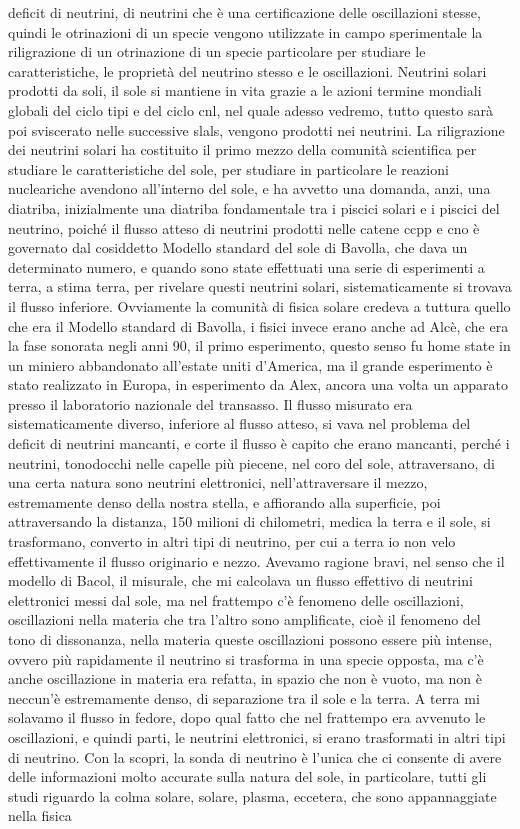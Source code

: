 deficit di neutrini, di neutrini che è una certificazione delle oscillazioni stesse, quindi le otrinazioni di un specie vengono utilizzate in campo sperimentale la riligrazione di un otrinazione di un specie particolare per studiare le caratteristiche, le proprietà del neutrino stesso e le oscillazioni. Neutrini solari prodotti da soli, il sole si mantiene in vita grazie a le azioni termine mondiali globali del ciclo tipi e del ciclo cnl, nel quale adesso vedremo, tutto questo sarà poi sviscerato nelle successive slals, vengono prodotti nei neutrini. La riligrazione dei neutrini solari ha costituito il primo mezzo della comunità scientifica per studiare le caratteristiche del sole, per studiare in particolare le reazioni nucleariche avendono all'interno del sole, e ha avvetto una domanda, anzi, una diatriba, inizialmente una diatriba fondamentale tra i piscici solari e i piscici del neutrino, poiché il flusso atteso di neutrini prodotti nelle catene ccpp e cno è governato dal cosiddetto Modello standard del sole di Bavolla, che dava un determinato numero, e quando sono state effettuati una serie di esperimenti a terra, a stima terra, per rivelare questi neutrini solari, sistematicamente si trovava il flusso inferiore. Ovviamente la comunità di fisica solare credeva a tuttura quello che era il Modello standard di Bavolla, i fisici invece erano anche ad Alcè, che era la fase sonorata negli anni 90, il primo esperimento, questo senso fu home state in un miniero abbandonato all'estate uniti d'America, ma il grande esperimento è stato realizzato in Europa, in esperimento da Alex, ancora una volta un apparato presso il laboratorio nazionale del transasso. Il flusso misurato era sistematicamente diverso, inferiore al flusso atteso, si vava nel problema del deficit di neutrini mancanti, e corte il flusso è capito che erano mancanti, perché i neutrini, tonodocchi nelle capelle più piecene, nel coro del sole, attraversano, di una certa natura sono neutrini elettronici, nell'attraversare il mezzo, estremamente denso della nostra stella, e affiorando alla superficie, poi attraversando la distanza, 150 milioni di chilometri, medica la terra e il sole, si trasformano, converto in altri tipi di neutrino, per cui a terra io non velo effettivamente il flusso originario e nezzo. Avevamo ragione bravi, nel senso che il modello di Bacol, il misurale, che mi calcolava un flusso effettivo di neutrini elettronici messi dal sole, ma nel frattempo c'è fenomeno delle oscillazioni, oscillazioni nella materia che tra l'altro sono amplificate, cioè il fenomeno del tono di dissonanza, nella materia queste oscillazioni possono essere più intense, ovvero più rapidamente il neutrino si trasforma in una specie opposta, ma c'è anche oscillazione in materia era refatta, in spazio che non è vuoto, ma non è neccun'è estremamente denso, di separazione tra il sole e la terra. A terra mi solavamo il flusso in fedore, dopo qual fatto che nel frattempo era avvenuto le oscillazioni, e quindi parti, le neutrini elettronici, si erano trasformati in altri tipi di neutrino. Con la scopri, la sonda di neutrino è l'unica che ci consente di avere delle informazioni molto accurate sulla natura del sole, in particolare, tutti gli studi riguardo la colma solare, solare, plasma, eccetera, che sono appannaggiate nella fisica 